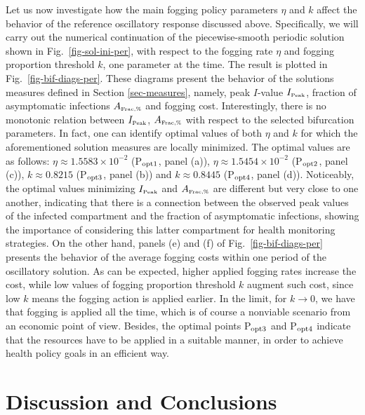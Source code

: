 \documentclass[preprint]{elsarticle}
\begin{document}
Let us now investigate how the main fogging policy parameters $\eta$ and $k$ affect the behavior of the reference oscillatory response discussed above. Specifically, we will carry out the numerical continuation of the piecewise-smooth periodic solution shown in Fig.\ \ref{fig-sol-ini-per}, with respect to the fogging rate $\eta$ and fogging proportion threshold $k$, one parameter at the time. The result is plotted in Fig.\ \ref{fig-bif-diags-per}. These diagrams present the behavior of the solutions measures defined in Section \ref{sec-measures}, namely, peak $I$-value $I_{\text{\tiny Peak}}$, fraction of asymptomatic infections $A_{\text{\tiny Frac,\%}}$ and fogging cost. Interestingly, there is no monotonic relation between $I_{\text{\tiny Peak}}$, $A_{\text{\tiny Frac,\%}}$ with respect to the selected bifurcation parameters. In fact, one can identify optimal values of both $\eta$ and $k$ for which the aforementioned solution measures are locally minimized. The optimal values are as follows: $\eta\approx1.5583\times10^{-2}$ (P$_{\scriptsize\mbox{opt1}}$, panel (a)), $\eta\approx1.5454\times10^{-2}$ (P$_{\scriptsize\mbox{opt2}}$, panel (c)), $k\approx0.8215$ (P$_{\scriptsize\mbox{opt3}}$, panel (b)) and $k\approx0.8445$ (P$_{\scriptsize\mbox{opt4}}$, panel (d)). Noticeably, the optimal values minimizing  $I_{\text{\tiny Peak}}$ and $A_{\text{\tiny Frac,\%}}$ are different but very close to one another, indicating that there is a connection between the observed peak values of the infected compartment and the fraction of asymptomatic infections, showing the importance of considering this latter compartment for health monitoring strategies. On the other hand, panels (e) and (f) of Fig.\ \ref{fig-bif-diags-per} presents the behavior of the average fogging costs within one period of the oscillatory solution. As can be expected, higher applied fogging rates increase the cost, while low values of fogging proportion threshold $k$ augment such cost, since low $k$ means the fogging action is applied earlier. In the limit, for $k\to0$, we have that fogging is applied all the time, which is of course a nonviable scenario from an economic point of view. Besides, the optimal points P$_{\scriptsize\mbox{opt3}}$ and P$_{\scriptsize\mbox{opt4}}$ indicate that the resources have to be applied in a suitable manner, in order to achieve health policy goals in an efficient way.



\section{Discussion and Conclusions}\label{Sec5}
\end{document}
